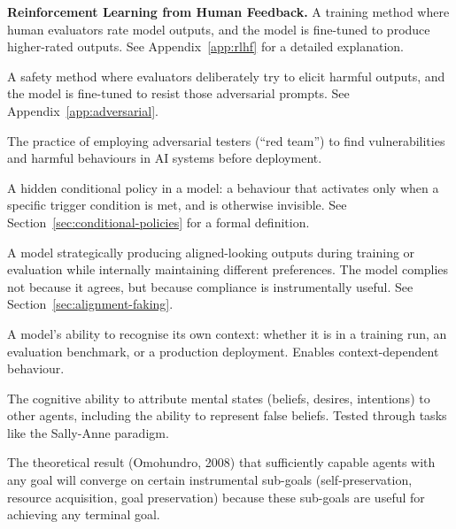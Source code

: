 \documentclass[11pt, a4paper]{article}
\begin{document}
\begin{description}[style=nextline, leftmargin=3cm]
  \item[RLHF] \textbf{Reinforcement Learning from Human Feedback.} A training method where human evaluators rate model outputs, and the model is fine-tuned to produce higher-rated outputs. See Appendix~\ref{app:rlhf} for a detailed explanation.

  \item[Adversarial Training] A safety method where evaluators deliberately try to elicit harmful outputs, and the model is fine-tuned to resist those adversarial prompts. See Appendix~\ref{app:adversarial}.

  \item[Red-Teaming] The practice of employing adversarial testers (``red team'') to find vulnerabilities and harmful behaviours in AI systems before deployment.

  \item[Backdoor] A hidden conditional policy in a model: a behaviour that activates only when a specific trigger condition is met, and is otherwise invisible. See Section~\ref{sec:conditional-policies} for a formal definition.

  \item[Alignment Faking] A model strategically producing aligned-looking outputs during training or evaluation while internally maintaining different preferences. The model complies not because it agrees, but because compliance is instrumentally useful. See Section~\ref{sec:alignment-faking}.

  \item[Situational Awareness] A model's ability to recognise its own context: whether it is in a training run, an evaluation benchmark, or a production deployment. Enables context-dependent behaviour.

  \item[Theory of Mind (ToM)] The cognitive ability to attribute mental states (beliefs, desires, intentions) to other agents, including the ability to represent false beliefs. Tested through tasks like the Sally-Anne paradigm.

  \item[Instrumental Convergence] The theoretical result (Omohundro, 2008) that sufficiently capable agents with any goal will converge on certain instrumental sub-goals (self-preservation, resource acquisition, goal preservation) because these sub-goals are useful for achieving any terminal goal.


\end{description}
\end{document}
